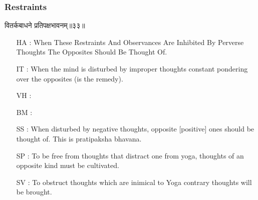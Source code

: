 \begin{frame}[fragile]\frametitle{Restraints}
\begin{sanskrit}
वितर्कबाधने प्रतिपक्षभावनम्॥३३॥
\end{sanskrit}

	\begin{itemize}
	\item [HA]: When These Restraints And Observances Are Inhibited By Perverse Thoughts The Opposites Should Be Thought Of.
	\item [IT]: When the mind is disturbed by improper thoughts constant pondering over the opposites (is the remedy).
	\item [VH]: 
	\item [BM]: 
	\item [SS]: When disturbed by negative thoughts, opposite [positive] ones should be thought of. This is pratipaksha bhavana.
	\item [SP]: To be free from thoughts that distract one from yoga, thoughts of an opposite kind must be cultivated.
	\item [SV]: To obstruct thoughts which are inimical to Yoga contrary thoughts will be brought. 
	\end{itemize}
\end{frame}



